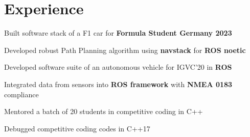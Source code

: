 \documentclass[letterpaper]{deedy-resume} %
\begin{document}
\begin{minipage}[t]{0.66\textwidth} %


\section{Experience}

\hspace{4cm}
\vspace{\topsep}
\begin{tightitemize}
\item Built software stack of a F1 car for {\bf Formula Student Germany 2023}
\item Developed robust Path Planning algorithm using \textbf{navstack} for \textbf{ROS noetic}
\end{tightitemize}

\sectionspace


\begin{tightitemize}
\item Developed software suite of an autonomous vehicle for IGVC'20 in {\bf ROS}
\item Integrated data from sensors into {\bf{ROS framework}} with {\bf{NMEA 0183}} compliance
\end{tightitemize}

\sectionspace %


\begin{tightitemize}
\item Mentored a batch of 20 students in competitive coding in C++
\item Debugged competitive coding codes in C++17
\end{tightitemize}


\sectionspace %


\end{minipage}
\end{document}
